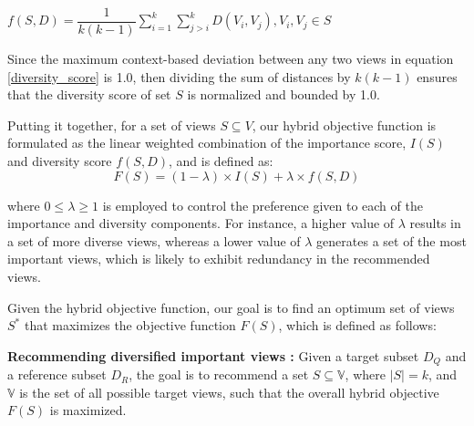 $ f\left(S,D\right)= \dfrac{1}{k\left(k-1\right)}  \sum_{i=1}^{k} \sum_{j>i}^{k} D\left(V_i,V_j\right) ,V_i,V_j  \in S $

Since the maximum context-based deviation between any two views in equation \ref{diversity_score}  is 1.0, then dividing the sum of distances by $k\left(k-1\right)$ ensures that the diversity score of set $S$ is normalized and bounded by 1.0.

%
Putting it together, for a set of views $S \subseteq V$, our hybrid objective function is formulated as the linear weighted combination of the importance score, $ I\left(S\right) $ and diversity score $ f\left(S,D\right) $, and is defined as:
\begin{equation}
F\left(S\right) =  \left(1-\lambda\right) \times I\left(S\right) + \lambda \times f\left(S,D\right)
\label{objectif_function}
\end{equation}

where $ 0 \leq \lambda \geq 1 $ is employed to control the preference given to each of the importance and diversity components. 
%
For instance, a higher value of $  \lambda $ results in a set of more diverse views, whereas a lower value of $ \lambda $ generates a set of the most important views, which is likely to exhibit redundancy in the recommended views. 
%

Given the hybrid objective function, our goal is to find an optimum set of views  $ S^* $ that maximizes the objective function $ F\left(S\right) $, which is defined as follows:
\begin{definition} 
{\bf Recommending diversified important views :} Given a target subset $D_Q$  and a reference subset $D_R$, the goal is to recommend a set $S \subseteq \mathbb{V}$, where $|S| = k$, and $\mathbb{V}$ is the set of all possible target views, such that the overall hybrid objective $ F\left(S\right) $ is maximized. 
\end{definition} 

%





